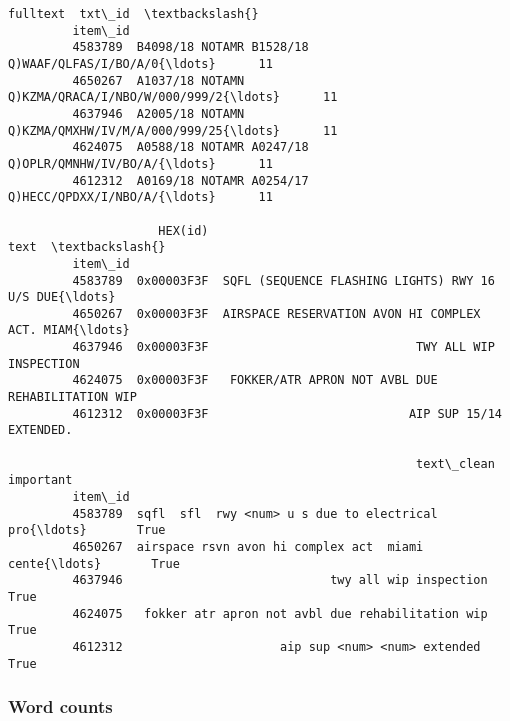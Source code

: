 \documentclass[11pt]{article}
\begin{document}
\begin{Verbatim}[commandchars=\\\{\}]
                                                           fulltext  txt\_id  \textbackslash{}
         item\_id                                                              
         4583789  B4098/18 NOTAMR B1528/18 Q)WAAF/QLFAS/I/BO/A/0{\ldots}      11   
         4650267  A1037/18 NOTAMN Q)KZMA/QRACA/I/NBO/W/000/999/2{\ldots}      11   
         4637946  A2005/18 NOTAMN Q)KZMA/QMXHW/IV/M/A/000/999/25{\ldots}      11   
         4624075  A0588/18 NOTAMR A0247/18 Q)OPLR/QMNHW/IV/BO/A/{\ldots}      11   
         4612312  A0169/18 NOTAMR A0254/17 Q)HECC/QPDXX/I/NBO/A/{\ldots}      11   
         
                     HEX(id)                                               text  \textbackslash{}
         item\_id                                                                  
         4583789  0x00003F3F  SQFL (SEQUENCE FLASHING LIGHTS) RWY 16 U/S DUE{\ldots}   
         4650267  0x00003F3F  AIRSPACE RESERVATION AVON HI COMPLEX ACT. MIAM{\ldots}   
         4637946  0x00003F3F                             TWY ALL WIP INSPECTION   
         4624075  0x00003F3F   FOKKER/ATR APRON NOT AVBL DUE REHABILITATION WIP   
         4612312  0x00003F3F                            AIP SUP 15/14 EXTENDED.   
         
                                                         text\_clean  important  
         item\_id                                                                
         4583789  sqfl  sfl  rwy <num> u s due to electrical pro{\ldots}       True  
         4650267  airspace rsvn avon hi complex act  miami cente{\ldots}       True  
         4637946                             twy all wip inspection       True  
         4624075   fokker atr apron not avbl due rehabilitation wip       True  
         4612312                      aip sup <num> <num> extended        True  
\end{Verbatim}
            
    \hypertarget{word-counts}{%
\subsubsection{Word counts}\label{word-counts}}
\end{document}
